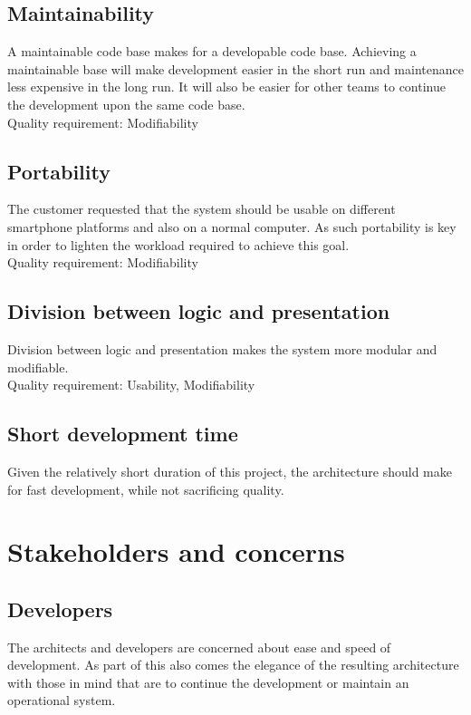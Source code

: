 \documentclass[11pt]{book}
\begin{document}
\subsection{Maintainability} 
A maintainable code base makes for a developable code base. Achieving a maintainable base will make development easier in the short run and maintenance less expensive in the long run. It will also be easier for other teams to continue the development upon the same code base.\\
Quality requirement: Modifiability

\subsection{Portability}
The customer requested that the system should be usable on different smartphone platforms and also on a normal computer. As such portability is key in order to lighten the workload required to achieve this goal.\\
Quality requirement: Modifiability

\subsection{Division between logic and presentation}
Division between logic and presentation makes the system more modular and modifiable.\\
Quality requirement: Usability, Modifiability

\subsection{Short development time}
Given the relatively short duration of this project, the architecture should make for fast development, while not sacrificing quality.

\section{Stakeholders and concerns}

\subsection{Developers}
The architects and developers are concerned about ease and speed of development. As part of this also comes the elegance of the resulting architecture with those in mind that are to continue the development or maintain an operational system.
\end{document}
